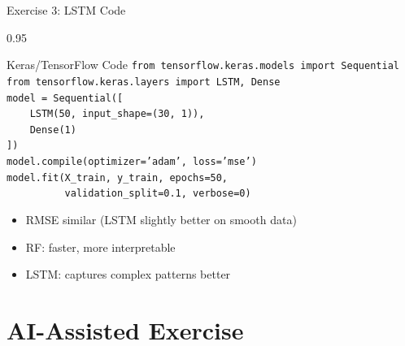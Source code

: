\documentclass[9pt, aspectratio=169, t]{beamer}
\begin{document}
\begin{frame}{Exercise 3: LSTM Code}
    \begin{cminipage}{0.95\textwidth}
    \begin{exampleblock}{Keras/TensorFlow Code}
        {\footnotesize
        \texttt{from tensorflow.keras.models import Sequential}\\
        \texttt{from tensorflow.keras.layers import LSTM, Dense}\\[0.2cm]
        \texttt{model = Sequential([}\\
        \texttt{~~~~LSTM(50, input\_shape=(30, 1)),}\\
        \texttt{~~~~Dense(1)}\\
        \texttt{])}\\[0.2cm]
        \texttt{model.compile(optimizer='adam', loss='mse')}\\
        \texttt{model.fit(X\_train, y\_train, epochs=50,}\\
        \texttt{~~~~~~~~~~validation\_split=0.1, verbose=0)}
        }
    \end{exampleblock}

    \vspace{0.2cm}
    \begin{itemize}\setlength{\itemsep}{0pt}
        \item RMSE similar (LSTM slightly better on smooth data)
        \item RF: faster, more interpretable
        \item LSTM: captures complex patterns better
    \end{itemize}
    \end{cminipage}
\end{frame}

\section{AI-Assisted Exercise}
\end{document}
